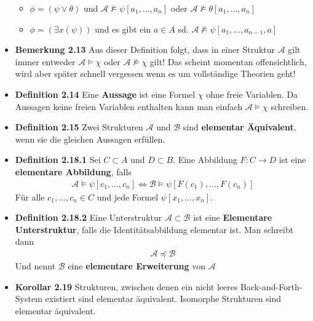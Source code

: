 \documentclass{scrartcl}
\renewcommand{\models}[0]{\vDash}
\begin{document}
\begin{itemize}
\begin{itemize}
        \item $\phi = (\psi \vee \theta)$ und $\mathcal{A} \nvDash \psi[a_1, \hdots, a_n]$ oder $\mathcal{A} \nvDash \theta[a_1, \hdots, a_n]$
        \item $\phi = (\exists x(\psi))$ und es gibt ein $a \in A$ sd. $\mathcal{A} \nvDash \psi[a_1, \hdots, {a_{n-1}}, a]$
    \end{itemize}
    \item \textbf{Bemerkung 2.13} Aus dieser Definition folgt, dass in einer Struktur $\mathcal{A}$ gilt immer entweder $\mathcal{A} \models \chi$ oder $\mathcal{A} \nvDash \chi$ gilt! Das scheint momentan offensichtlich, wird aber später schnell vergessen wenn es um vollständige Theorien geht!
    \item \textbf{Definition 2.14} Eine \textbf{Aussage} ist eine Formel $\chi$ ohne freie Variablen. Da Aussagen keine freien Variablen enthalten kann man einfach $\mathcal{A} \models \chi$ schreiben.
    \item \textbf{Definition 2.15} Zwei Strukturen $\mathcal{A}$ und $\mathcal{B}$ sind \textbf{elementar Äquivalent}, wenn sie die gleichen Aussagen erfüllen.
    \item \textbf{Definition 2.18.1} Sei $C \subset A$ und $D \subset B$. Eine Abbildung $F: C \to D$ ist eine \textbf{elementare Abbildung}, falls
    \begin{align*}
        \mathcal{A} \models \psi[c_1, \hdots, c_n] \Leftrightarrow \mathcal{B} \models \psi[F(c_1), \hdots, F(c_n)]
    \end{align*}
    Für alle $c_1, \hdots, c_n \in C$ und jede Formel $\psi[x_1, \hdots, x_n]$.
    \item \textbf{Definition 2.18.2} Eine Unterstruktur $\mathcal{A} \subset \mathcal{B}$ ist eine \textbf{Elementare Unterstruktur}, falls die Identitätsabbildung elementar ist. Man schreibt dann
    \begin{align*}
        \mathcal{A} \preceq \mathcal{B}
    \end{align*}
    Und nennt $\mathcal{B}$ eine \textbf{elementare Erweiterung} von $\mathcal{A}$
    \item \textbf{Korollar 2.19} Strukturen, zwischen denen ein nicht leeres Back-and-Forth-System existiert sind elementar äquivalent. Isomorphe Strukturen sind elementar äquivalent.
\end{itemize}
\end{document}
